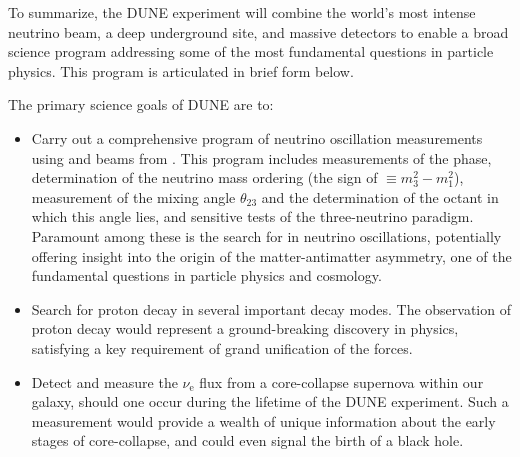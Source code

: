 To summarize, the DUNE experiment will combine the world's most
intense neutrino beam, a deep underground site, and massive \lar
detectors to enable a broad science program addressing some of
the most fundamental questions in particle physics.
This program is articulated in brief form below.

The primary science goals of DUNE are to:
\begin{itemize}

\item Carry out a comprehensive program of neutrino oscillation measurements using
      \numu and \anumu beams from \fnal. This program includes measurements of
      the  phase, determination of the neutrino mass ordering
      (the sign of $ \equiv m_3^2-m_1^2$), measurement of the mixing
      angle $\theta_{23}$ and the determination of the octant in which this
      angle lies, and sensitive tests of the three-neutrino paradigm.
      Paramount among these is the search for  in neutrino oscillations, potentially offering 
      insight into the origin of the matter-antimatter asymmetry,
      one of the fundamental questions in particle physics and cosmology.

\item Search for proton decay in several important decay modes.
      The observation of proton decay would represent a ground-breaking discovery
      in physics, satisfying a key requirement of grand unification of the forces.

\item Detect and measure the $\nu_\text{e}$ flux from a core-collapse
      supernova within our galaxy, should one occur during the lifetime
      of the DUNE experiment. Such a measurement would provide a wealth
      of unique information about the early stages of core-collapse, and
      could even signal the birth of a black hole.

\end{itemize}

